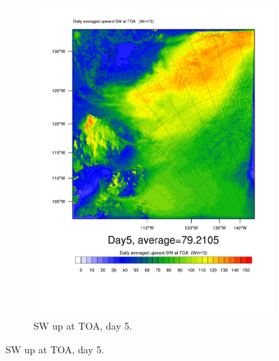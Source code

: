 \begin{figure}
\begin{subfigure}{0.48\textwidth}
		\includegraphics[width=\textwidth]{results/control/SWUPT_Day5.pdf}
		\caption{SW up at TOA, day 5.}
		\label{subfig:swup_r1Day5}
	\end{subfigure}
	

\end{figure}
